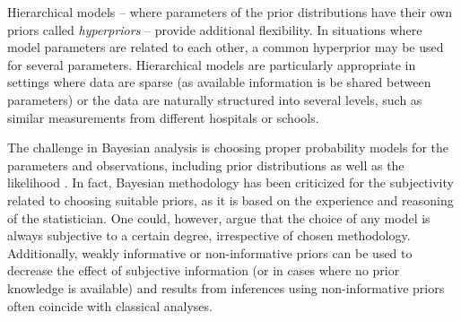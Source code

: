 Hierarchical models -- where parameters of the prior
distributions have their own priors called \emph{hyperpriors} -- provide
additional flexibility. In situations where model parameters are
related to each other, a common hyperprior may be used for several parameters.
Hierarchical models are particularly appropriate in settings where
data are sparse (as available information is be shared between parameters)
or the data are naturally structured into several levels, such as 
similar measurements from different hospitals or schools.

The challenge in Bayesian analysis is choosing proper probability models for
the parameters and observations, including prior distributions as well as the
likelihood \citep{Gelman2013}. In fact, Bayesian methodology has been
criticized for the subjectivity related to choosing suitable priors, as it is
based on the experience and reasoning of the statistician. One could, however,
argue that the choice of any model is always subjective to a certain degree,
irrespective of chosen methodology. Additionally, weakly informative or non-informative
priors can be used to decrease the effect of subjective information (or
in cases where no prior knowledge is available) and results from
inferences using non-informative priors often coincide with classical
analyses.







